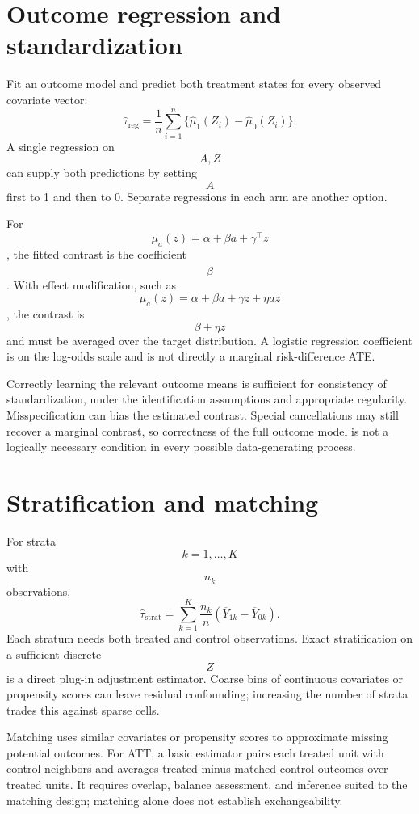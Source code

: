 \section{Outcome regression and standardization}
Fit an outcome model and predict both treatment states for every observed covariate vector:
\begin{equation}
\widehat\tau_{\mathrm{reg}}=\frac1n\sum_{i=1}^n
\{\widehat\mu_1(Z_i)-\widehat\mu_0(Z_i)\}.
\end{equation}
A single regression on $$A,Z$$ can supply both predictions by setting $$A$$ first to 1 and then to 0. Separate regressions in each arm are another option.

For $$\mu_a(z)=\alpha+\beta a+\gamma^\top z$$, the fitted contrast is the coefficient $$\widehat\beta$$. With effect modification, such as $$\mu_a(z)=\alpha+\beta a+\gamma z+\eta az$$, the contrast is $$\beta+\eta z$$ and must be averaged over the target distribution. A logistic regression coefficient is on the log-odds scale and is not directly a marginal risk-difference ATE.
\begin{remarkbox}
Correctly learning the relevant outcome means is sufficient for consistency of standardization, under the identification assumptions and appropriate regularity. Misspecification can bias the estimated contrast. Special cancellations may still recover a marginal contrast, so correctness of the full outcome model is not a logically necessary condition in every possible data-generating process.
\end{remarkbox}

\section{Stratification and matching}
For strata $$k=1,\ldots,K$$ with $$n_k$$ observations,
\begin{equation}
\widehat\tau_{\mathrm{strat}}=\sum_{k=1}^K\frac{n_k}{n}
(\overline Y_{1k}-\overline Y_{0k}).
\end{equation}
Each stratum needs both treated and control observations. Exact stratification on a sufficient discrete $$Z$$ is a direct plug-in adjustment estimator. Coarse bins of continuous covariates or propensity scores can leave residual confounding; increasing the number of strata trades this against sparse cells.

Matching uses similar covariates or propensity scores to approximate missing potential outcomes. For ATT, a basic estimator pairs each treated unit with control neighbors and averages treated-minus-matched-control outcomes over treated units. It requires overlap, balance assessment, and inference suited to the matching design; matching alone does not establish exchangeability.

